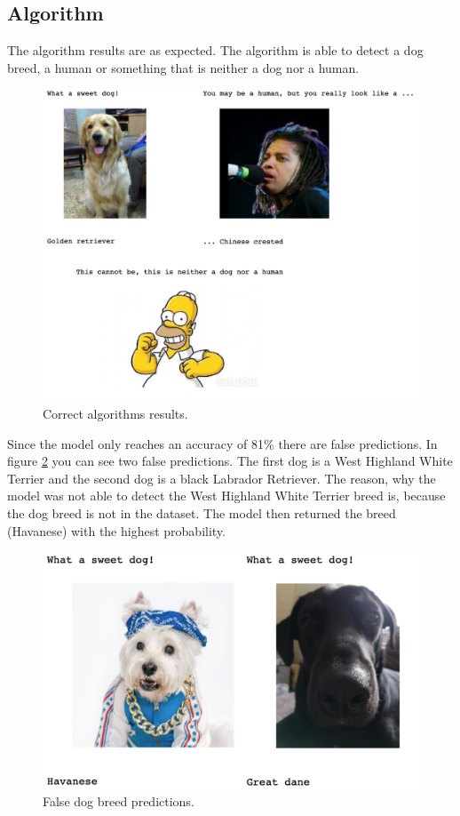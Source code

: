 \documentclass{article}
\begin{document}
\subsection{Algorithm} \label{su_algorithm}
The algorithm results are as expected. The algorithm is able to detect a dog breed, a human or something that is neither a dog nor a human.
\begin{figure}[H]
    \centering
    \includegraphics[scale=0.25]{./images/algorithm_result_true}
    \caption{Correct algorithms results.}
    \label{fig:algorithm_result_true}
\end{figure}

Since the model only reaches an accuracy of 81\% there are false predictions. In figure \ref{fig:algorithm_result_false} you can see two false predictions. The first dog is a West Highland White Terrier and the second dog is a black Labrador Retriever. The reason, why the model was not able to detect the West Highland White Terrier breed is, because the dog breed is not in the dataset. The model then returned the breed (Havanese) with the highest probability.
\begin{figure}[H]
    \centering
    \includegraphics[scale=0.25]{./images/algorithm_result_false}
    \caption{False dog breed predictions.}
    \label{fig:algorithm_result_false}
\end{figure}
\end{document}
